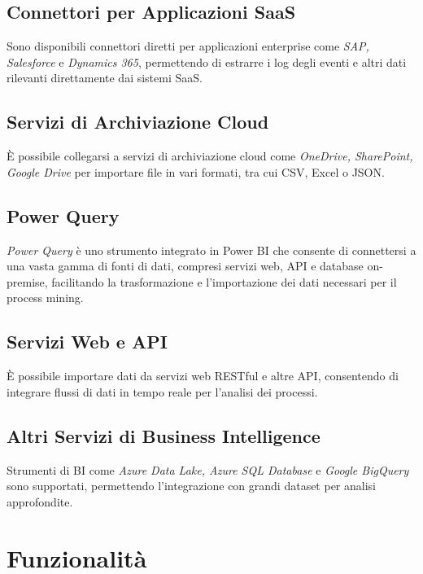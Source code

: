 \documentclass{article}
\begin{document}
\subsection{Connettori per Applicazioni SaaS}
Sono disponibili connettori diretti per applicazioni enterprise come \textit{SAP, Salesforce} e \textit{Dynamics 365}, permettendo di estrarre i log degli eventi e altri dati rilevanti direttamente dai sistemi SaaS.

\subsection{Servizi di Archiviazione Cloud}
È possibile collegarsi a servizi di archiviazione cloud come \textit{OneDrive, SharePoint, Google Drive} per importare file in vari formati, tra cui CSV, Excel o JSON.

\subsection{Power Query}
\textit{Power Query} è uno strumento integrato in Power BI che consente di connettersi a una vasta gamma di fonti di dati, compresi servizi web, API e database on-premise, facilitando la trasformazione e l'importazione dei dati necessari per il process mining.

\subsection{Servizi Web e API}
È possibile importare dati da servizi web RESTful e altre API, consentendo di integrare flussi di dati in tempo reale per l'analisi dei processi.

\subsection{Altri Servizi di Business Intelligence}
Strumenti di BI come \textit{Azure Data Lake, Azure SQL Database} e \textit{Google BigQuery} sono supportati, permettendo l'integrazione con grandi dataset per analisi approfondite.


\section{Funzionalità}
\end{document}
